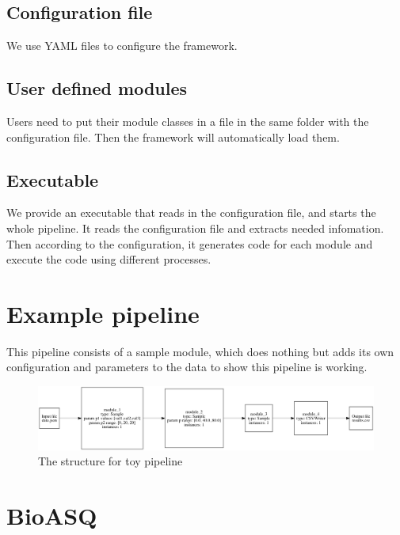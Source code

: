 \documentclass{article}
\begin{document}
    \subsection{Configuration file}
    We use YAML files to configure the framework.

    \subsection{User defined modules}
    Users need to put their module classes in a file in the same folder with the configuration file.
    Then the framework will automatically load them.

    \subsection{Executable}
    We provide an executable that reads in the configuration file, and starts the whole pipeline.
    It reads the configuration file and extracts needed infomation.
    Then according to the configuration, it generates code for each module and execute the code using different processes.


\section{Example pipeline}
    This pipeline consists of a sample module,
    which does nothing but adds its own configuration and parameters to the data to show this pipeline is working.

    \begin{figure}[H]
        \begin{center}
            \includegraphics[width=1.2\textwidth]{fig/toy_pipeline.png}
        \end{center}
        \label{fig:toy_pipeline}
        \caption{The structure for toy pipeline}
    \end{figure}



\section{BioASQ}
\end{document}
